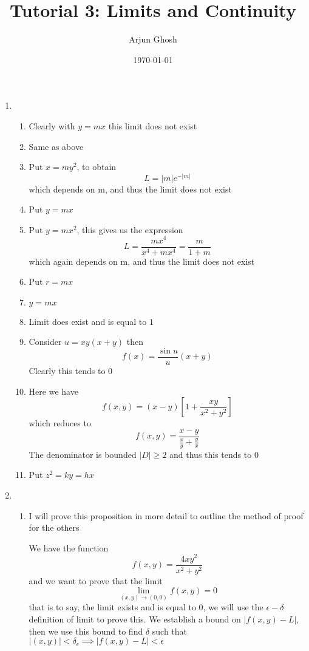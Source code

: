 \documentclass[12pt]{article}
\title{Tutorial 3: Limits and Continuity}
\author{Arjun Ghosh}
\date{\today}
\begin{document}
\maketitle
\begin{enumerate}
	\item
	
		\begin{enumerate}
			\item 
				Clearly with $y=mx$ this limit does not exist
			\item
				Same as above
			\item
				Put $x = my^{2}$, to obtain
				$$
				L = |m|e^{ -|m| }
				$$
				which depends on m, and thus the limit does not exist
			\item
				Put $y=mx$
			\item
				Put $y=mx^{2}$, this gives us the expression
				$$
				L = \frac{mx^{4}}{x^{4 }+mx^{4}} = \frac{m}{1+m}
				$$
				which again depends on m, and thus the limit does not exist
			\item
				Put $r = mx$
			\item
				$y=mx$
			\item
				Limit does exist and is equal to $1$
			\item
				Consider $u = xy(x+y)$
				then
				$$
				f(x) = \frac{\sin u}{u} (x+y)
				$$
				Clearly this tends to $0$
			\item
				Here we have
				$$
				f(x,y) = (x-y)\left[ 1 + \frac{xy}{x^{2} + y^{2}} \right]
				$$
				which reduces to
				$$
				f(x,y) = \frac{x-y}{ \frac{x}{y} + \frac{y}{x} }
				$$
				The denominator is bounded $|D| \geq 2$ and thus this tends to $0$
			\item
				Put $z^{2} = ky = hx$
		\end{enumerate}

	\item
		\begin{enumerate}
			\item
				I will prove this proposition in more detail to outline the method of proof for the others

				We have the function
				$$
				f(x,y) = \frac{4xy^{2}}{x^{2} + y^{2}}
				$$
				and we want to prove that the limit 
				$$
				\lim_{ (x,y) \to (0,0) } f(x,y) = 0
				$$
				that is to say, the limit exists and is equal to $0$, we will use the $\epsilon-\delta$ definition of limit to prove this.
				We establish a bound on $|f(x,y)-L|$, then we use this bound to find $\delta$ such that
				$|(x,y)|<\delta_{\epsilon} \implies |f(x,y)-L| < \epsilon$


\end{enumerate}
\end{enumerate}
\end{document}
